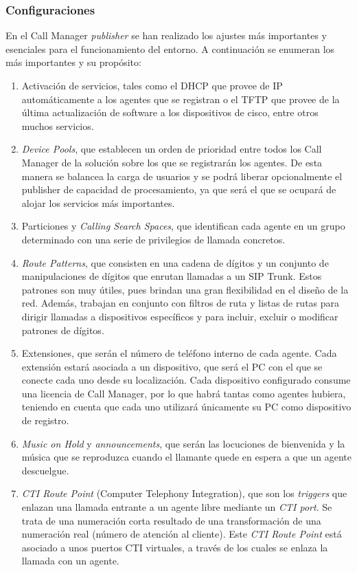 \documentclass[a4paper, 12pt]{book}
\begin{document}
\subsubsection{Configuraciones}
\label{sec:conf_cucm}
En el Call Manager \emph{publisher} se han realizado los ajustes más importantes y esenciales para el funcionamiento del entorno. A continuación se enumeran los más importantes y su propósito:
\begin{enumerate}
  \item Activación de servicios, tales como el DHCP que provee de IP automáticamente a los agentes que se registran o el TFTP que provee de la última actualización de software a los dispositivos de cisco, entre otros muchos servicios.
  \item \emph{Device Pools}, que establecen un orden de prioridad entre todos los Call Manager de la solución sobre los que se registrarán los agentes. De esta manera se balancea la carga de usuarios y se podrá liberar opcionalmente el publisher de capacidad de procesamiento, ya que será el que se ocupará de alojar los servicios más importantes.
  \item Particiones y \emph{Calling Search Spaces}, que identifican cada agente en un grupo determinado con una serie de privilegios de llamada concretos.
  \item \emph{Route Patterns}, que consisten en una cadena de dígitos y un conjunto de manipulaciones de dígitos que enrutan llamadas a un SIP Trunk. Estos patrones son muy útiles, pues brindan una gran flexibilidad en el diseño de la red. Además, trabajan en conjunto con filtros de ruta y listas de rutas para dirigir llamadas a dispositivos específicos y para incluir, excluir o modificar patrones de dígitos.
  \item Extensiones, que serán el número de teléfono interno de cada agente. Cada extensión estará asociada a un dispositivo, que será el PC con el que se conecte cada uno desde su localización. Cada dispositivo configurado consume una licencia de Call Manager, por lo que habrá tantas como agentes hubiera, teniendo en cuenta que cada uno utilizará únicamente su PC como dispositivo de registro.
  \item \emph{Music on Hold} y \emph{announcements}, que serán las locuciones de bienvenida y la música que se reproduzca cuando el llamante quede en espera a que un agente descuelgue.
  \item \emph{CTI Route Point} (Computer Telephony Integration), que son los \emph{triggers} que enlazan una llamada entrante a un agente libre mediante un \emph{CTI port}. Se trata de una numeración corta resultado de una transformación de una numeración real (número de atención al cliente). Este \emph{CTI Route Point} está asociado a unos puertos CTI virtuales, a través de los cuales se enlaza la llamada con un agente.

\end{enumerate}
\end{document}
